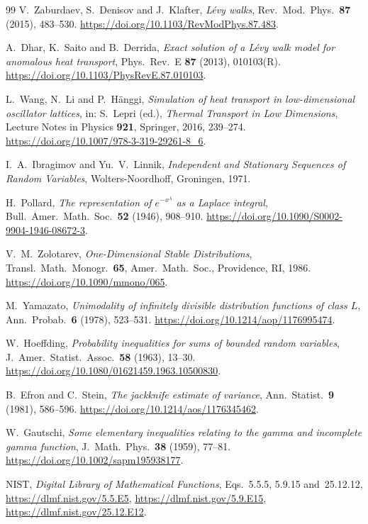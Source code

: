 \documentclass[11pt]{article}
\theoremstyle{definition}
\theoremstyle{remark}
\begin{document}
\begin{thebibliography}{99}
V.~Zaburdaev, S.~Denisov and J.~Klafter, \emph{L\'evy walks}, Rev.\ Mod.\
Phys.\ \textbf{87} (2015), 483--530.
\url{https://doi.org/10.1103/RevModPhys.87.483}.

A.~Dhar, K.~Saito and B.~Derrida, \emph{Exact solution of a L\'evy walk model
for anomalous heat transport}, Phys.\ Rev.\ E \textbf{87} (2013),
010103(R). \url{https://doi.org/10.1103/PhysRevE.87.010103}.

L.~Wang, N.~Li and P.~H\"anggi, \emph{Simulation of heat transport in
low-dimensional oscillator lattices}, in: S.~Lepri (ed.), \emph{Thermal
Transport in Low Dimensions}, Lecture Notes in Physics \textbf{921},
Springer, 2016, 239--274.
\url{https://doi.org/10.1007/978-3-319-29261-8_6}.

I.~A.~Ibragimov and Yu.~V.~Linnik, \emph{Independent and Stationary
Sequences of Random Variables}, Wolters-Noordhoff, Groningen, 1971.

H.~Pollard, \emph{The representation of $e^{-x^\lambda}$ as a Laplace
integral}, Bull.\ Amer.\ Math.\ Soc.\ \textbf{52} (1946), 908--910.
\url{https://doi.org/10.1090/S0002-9904-1946-08672-3}.

V.~M.~Zolotarev, \emph{One-Dimensional Stable Distributions}, Transl.\
Math.\ Monogr.\ \textbf{65}, Amer.\ Math.\ Soc., Providence, RI, 1986.
\url{https://doi.org/10.1090/mmono/065}.

M.~Yamazato, \emph{Unimodality of infinitely divisible distribution
functions of class $L$}, Ann.\ Probab.\ \textbf{6} (1978), 523--531.
\url{https://doi.org/10.1214/aop/1176995474}.

W.~Hoeffding, \emph{Probability inequalities for sums of bounded random
variables}, J.\ Amer.\ Statist.\ Assoc.\ \textbf{58} (1963), 13--30.
\url{https://doi.org/10.1080/01621459.1963.10500830}.

B.~Efron and C.~Stein, \emph{The jackknife estimate of variance}, Ann.\
Statist.\ \textbf{9} (1981), 586--596.
\url{https://doi.org/10.1214/aos/1176345462}.

\bibitem{gautschi1959}
W.~Gautschi, \emph{Some elementary inequalities relating to the gamma and
incomplete gamma function}, J.\ Math.\ Phys.\ \textbf{38} (1959), 77--81.
\url{https://doi.org/10.1002/sapm195938177}.

\bibitem{dlmf}
NIST, \emph{Digital Library of Mathematical Functions}, Eqs.~5.5.5, 5.9.15
and~25.12.12, \url{https://dlmf.nist.gov/5.5.E5},
\url{https://dlmf.nist.gov/5.9.E15}, \url{https://dlmf.nist.gov/25.12.E12}.


\end{thebibliography}
\end{document}
